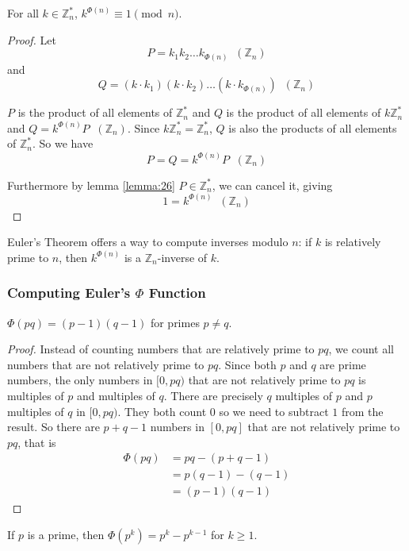 \documentclass[11pt]{article}
\newcommand{\Zn}{\mathbb{Z}_n}
\newcommand{\Zns}{\mathbb{Z}^\ast_n}
\newcommand{\Inzns}{\;\;(\Zn)}
\begin{document}
\begin{theorem}
For all $k \in \Zns$, $k^{\Phi(n)} \equiv 1 \pmod{n}$.
\end{theorem}

\begin{proof}
Let
\[
  P = k_1k_2 \dots k_{\Phi(n)} \Inzns
\]
and
\[
  Q = (k \cdot k_1)(k \cdot k_2) \dots (k \cdot k_{\Phi(n)}) \Inzns
\]

$P$ is the product of all elements of $\Zns$ and $Q$ is the product of all elements of
$k\Zns$ and $Q = k^{\Phi(n)}P \Inzns$. Since $k\Zns = \Zns$, $Q$ is also the products of all
elements of $\Zns$. So we have
\[
  P = Q = k^{\Phi(n)}P \Inzns
\]

Furthermore by lemma \ref{lemma:26} $P \in \Zns$, we can cancel it, giving
\[
  1 = k^{\Phi(n)} \Inzns
\]
\end{proof}

Euler's Theorem offers a way to compute inverses modulo $n$: if $k$ is relatively prime to
$n$, then $k^{\Phi(n)}$ is a $\Zn$-inverse of $k$.

\subsubsection{Computing Euler's $\Phi$ Function}

\begin{lemma}
$\Phi(pq) = (p-1)(q-1)$ for primes $p \neq q$.
\end{lemma}

\begin{proof}
Instead of counting numbers that are relatively prime to $pq$, we count all numbers that are
not relatively prime to $pq$. Since both $p$ and $q$ are prime numbers, the only numbers in
$[0, pq)$ that are not relatively prime to $pq$ is multiples of $p$ and multiples of $q$.
There are precisely $q$ multiples of $p$ and $p$ multiples of $q$ in $[0, pq)$. They both
count $0$ so we need to subtract $1$ from the result. So there are $p + q - 1$ numbers in
$[0, pq]$ that are not relatively prime to $pq$, that is
\begin{align*}
\Phi(pq) &= pq - (p + q - 1) \\
&=p(q-1) - (q - 1) \\
&=(p-1)(q-1)
\end{align*}
\end{proof}

\begin{theorem}
If $p$ is a prime, then $\Phi(p^k) = p^k - p^{k-1}$ for $k \geq 1$.
\end{theorem}
\end{document}
